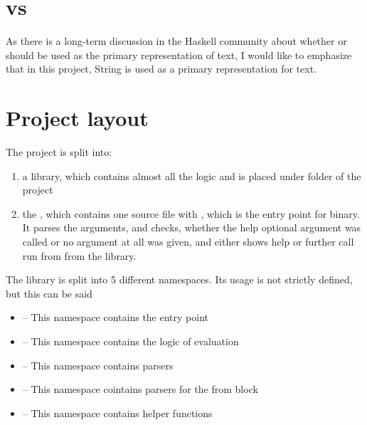 \section{ vs }
As there is a long-term discussion in the Haskell community about whether  or  should be used as the 
primary representation of text, I would like to emphasize that in this project, String is used as a primary
representation for text.

\section{Project layout}

The project is split into:
\begin{enumerate}
  \item a library, which contains almost all the logic and is placed under
        folder of the project

  \item the , which contains one source file
      with , which is the entry point for  binary. 
      It parses the arguments, and checks, whether the help optional argument was called or no argument at all was given, 
      and either shows help or further call run from  from the library.
\end{enumerate}

The library is split into 5 different namespaces. Its usage is not strictly defined, but this can be said
\begin{itemize}
    \item {} -- This namespace contains the entry point
    \item {} -- This namespace contains the logic of evaluation
    \item {} -- This namespace contains parsers
    \item {} -- This namespace cointains parsers for the from block
    \item {} -- This namespace contains helper functions
\end{itemize}

